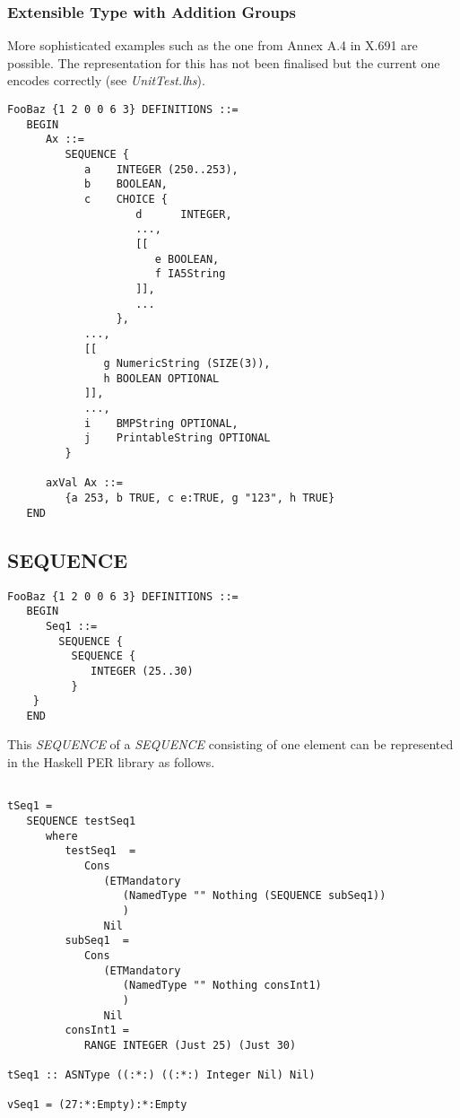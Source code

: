 \documentclass{article}
\begin{document}
\subsubsection{Extensible Type with Addition Groups}

More sophisticated examples such as the one from Annex A.4 in X.691 are
possible. The representation for this has not been finalised but the
current one encodes correctly (see {\em UnitTest.lhs}).

\begin{lstlisting}[frame=single]
FooBaz {1 2 0 0 6 3} DEFINITIONS ::=
   BEGIN
      Ax ::= 
         SEQUENCE {
            a    INTEGER (250..253),
            b    BOOLEAN,
            c    CHOICE {
                    d      INTEGER,
                    ...,
                    [[
                       e BOOLEAN,
                       f IA5String
                    ]],
                    ...
                 },
            ...,
            [[
               g NumericString (SIZE(3)),
               h BOOLEAN OPTIONAL
            ]],
            ...,
            i    BMPString OPTIONAL,
            j    PrintableString OPTIONAL
         }

      axVal Ax ::= 
         {a 253, b TRUE, c e:TRUE, g "123", h TRUE}
   END

\end{lstlisting}

\subsection{SEQUENCE}

\begin{lstlisting}[frame=single]
FooBaz {1 2 0 0 6 3} DEFINITIONS ::=
   BEGIN
      Seq1 ::= 
        SEQUENCE {
          SEQUENCE {
             INTEGER (25..30)
          }
	}
   END
\end{lstlisting}

This {\em SEQUENCE} of a {\em SEQUENCE} consisting of one element
can be represented in the Haskell PER library as follows.

\begin{lstlisting}[frame=single]

tSeq1 = 
   SEQUENCE testSeq1 
      where
         testSeq1  = 
            Cons 
               (ETMandatory 
                  (NamedType "" Nothing (SEQUENCE subSeq1))
                  )
               Nil
         subSeq1  = 
            Cons 
               (ETMandatory 
                  (NamedType "" Nothing consInt1)
                  ) 
               Nil
         consInt1 = 
            RANGE INTEGER (Just 25) (Just 30)

tSeq1 :: ASNType ((:*:) ((:*:) Integer Nil) Nil)

vSeq1 = (27:*:Empty):*:Empty

\end{lstlisting}
\end{document}

